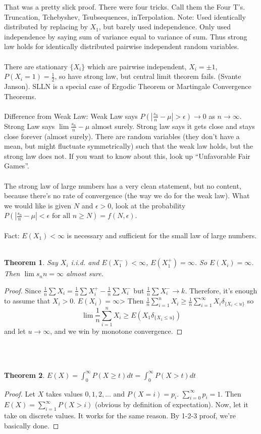 \documentclass[12pt]{article}
\newtheorem{theorem}{Theorem}
\begin{document}
That was a pretty slick proof.  There were four tricks.  Call them the Four T's.  Truncation, Tchebyshev, Tsubsequences, inTerpolation.  Note: Used identically distributed by replacing by $X_1$, but barely used independence.  Only used independence  by saying sum of variance equal to variance of sum.  Thus strong law holds for identically distributed pairwise independent random variables.
\\ \\
There are stationary $\{X_i\}$ which are pairwise independent, $X_i = \pm 1$, $P(X_i = 1) = \frac{1}{2}$, so have strong law, but central limit theorem fails.  (Svante Janson).  SLLN is a special case of Ergodic Theorem or Martingale Convergence Theorems.
\\ \\
Difference from Weak Law: Weak Law says $P(|\frac{s_n}{n} - \mu | > \epsilon) \to 0$ as $n \to \infty$.  Strong Law says $\lim \frac{s_n}{n} - \mu$ almost surely.  Strong law says it gets close and stays close forever (almost surely).  There are random variables (they don't have a mean, but might fluctuate symmetrically) such that the weak law holds, but the strong law does not.  If you want to know about this, look up ``Unfavorable Fair Games''.
\\ \\
The strong law of large numbers has a very clean statement, but no content, because there's no rate of convergence (the way we do for the weak law).  What we would like is given $N$ and $\epsilon > 0$, look at the probability $P(|\frac{s_n}{n} - \mu | < \epsilon \textrm{ for all } n \ge N) = f(N, \epsilon)$.
\\ \\
Fact: $E(X_1) < \infty$ is necessary and sufficient for the small law of large numbers.
\\ \\
\begin{theorem}
Say $X_i$ i.i.d. and $E(X_1^-) < \infty$, $E(X_1^+) = \infty$.  So $E(X_i) = \infty$.  Then $\lim{s_n}{n} = \infty$ almost sure.
\end{theorem}
\begin{proof}
Since $\frac{1}{n} \sum X_i = \frac{1}{n} \sum X_i^+ - \frac{1}{n} \sum X_i^-$ but $\frac{1}{n} \sum X_i^- \to k$.  Therefore, it's enough to assume that $X_i > 0$.  $E(X_i) = \infty$>  Then $\frac{1}{n} \sum_{i=1}^n X_i \ge \frac{1}{n} \sum_{i=1}^\infty X_i \delta_{\{X_i < u \}}$
so
$$\lim \frac{1}{n} \sum_{i=1}^n X_i \ge E(X_1 \delta_{\{X_1 \le u \}})$$
and let $u \to \infty$, and we win by monotone convergence.
\end{proof}
\\ \\
\begin{theorem}
$E(X) = \int_0^\infty P(X \ge t) dt = \int_0^\infty P(X > t) dt$
\end{theorem}
\begin{proof}
Let $X$ takes values $0, 1, 2, ...$ and $P(X = i) = p_i$.  $\sum_{i=0}^\infty p_i = 1$.  Then $E(X) = \sum_{i=1}^\infty P(X > i)$ (obvious by definition of expectation).  Now, let it take on discrete values.  It works for the same reason.  By 1-2-3 proof, we're basically done.
\end{proof}
\end{document}
